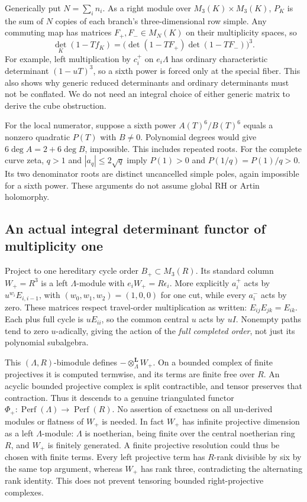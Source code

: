 Generically put $N=\sum_i n_i$. As a right module over $M_3(K)\times M_3(K)$, $P_K$ is the sum of $N$ copies of each branch's three-dimensional row simple. Any commuting map has matrices $F_+,F_-\in M_N(K)$ on their multiplicity spaces, so
\[
 \det_K(1-Tf_K)=\bigl(\det(1-TF_+)\det(1-TF_-)\bigr)^3.
\]
For example, left multiplication by $c_i^+$ on $e_i\Lambda$ has ordinary characteristic determinant $(1-uT)^3$, so a sixth power is forced only at the special fiber. This also shows why generic reduced determinants and ordinary determinants must not be conflated. We do not need an integral choice of either generic matrix to derive the cube obstruction.

For the local numerator, suppose a sixth power $A(T)^6/B(T)^6$ equals a nonzero quadratic $P(T)$ with $B\ne0$. Polynomial degrees would give $6\deg A=2+6\deg B$, impossible. This includes repeated roots. For the complete curve zeta, $q>1$ and $|a_q|\le2\sqrt q$ imply $P(1)>0$ and $P(1/q)=P(1)/q>0$. Its two denominator roots are distinct uncancelled simple poles, again impossible for a sixth power. These arguments do not assume global RH or Artin holomorphy.

\subsection{An actual integral determinant functor of multiplicity one}
Project to one hereditary cycle order $B_+\subset M_3(R)$. Its standard column $W_+=R^3$ is a left $\Lambda$-module with $e_iW_+=R\epsilon_i$. More explicitly $a_i^+$ acts by $u^{w_i}E_{i,i-1}$, with $(w_0,w_1,w_2)=(1,0,0)$ for one cut, while every $a_i^-$ acts by zero. These matrices respect travel-order multiplication as written: $E_{ij}E_{jk}=E_{ik}$. Each plus full cycle is $uE_{ii}$, so the common central $u$ acts by $uI$. Nonempty paths tend to zero $u$-adically, giving the action of the \emph{full completed order}, not just its polynomial subalgebra.

This $(\Lambda,R)$-bimodule defines $-\otimes_\Lambda^{\mathbf L}W_+$. On a bounded complex of finite projectives it is computed termwise, and its terms are finite free over $R$. An acyclic bounded projective complex is split contractible, and tensor preserves that contraction. Thus it descends to a genuine triangulated functor $\Phi_+:\operatorname{Perf}(\Lambda)\to\operatorname{Perf}(R)$. No assertion of exactness on all un-derived modules or flatness of $W_+$ is needed. In fact $W_+$ has infinite projective dimension as a left $\Lambda$-module: $\Lambda$ is noetherian, being finite over the central noetherian ring $R$, and $W_+$ is finitely generated. A finite projective resolution could thus be chosen with finite terms. Every left projective term has $R$-rank divisible by six by the same top argument, whereas $W_+$ has rank three, contradicting the alternating rank identity. This does not prevent tensoring bounded right-projective complexes.

